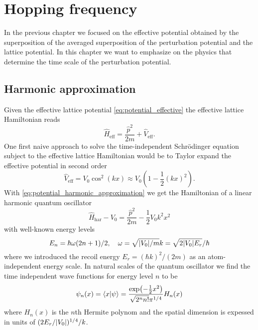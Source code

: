 \chapter{Hopping frequency}

In the previous chapter we focused on the effective potential obtained by the
superposition of the averaged superposition of the perturbation potential and
the lattice potential. In this chapter we want to emphasize on the physics
that determine the time scale of the perturbation potential.

\section{Harmonic approximation}

Given the effective lattice potential \cref{eq:potential_effective} the
effective lattice Hamiltonian reads
\begin{equation}
  \hat{H}_\text{eff}
  =\frac{\hat{p}^2}{2m}+\hat{V}_\text{eff}
  \label{eq:hamiltonian_effective}.
\end{equation}
One first naive approach to solve the time-independent Schrödinger equation
subject to the effective lattice Hamiltonian would be to Taylor expand
the effective potential in second order
\begin{equation}
  \hat{V}_\text{eff}
  =V_0\cos^2(kx)
  \approx V_0\left(1-\frac{1}{2}(kx)^2\right)
  \label{eq:potential_harmonic_approximation}.
\end{equation}
With \cref{eq:potential_harmonic_approximation} we get the Hamiltonian of a
linear harmonic quantum oscillator
\begin{equation}
  \hat{H}_\text{har}-V_0
  =\frac{\hat{p}^2}{2m}-\frac{1}{2}V_0k^2x^2
  \label{eq:hamiltonian_harmonic_approximation}
\end{equation}
with well-known energy levels
\begin{equation}
  E_n=\hbar\omega(2n+1)/2
  \qc
  \omega=\sqrt{\abs{V_0}/m}k=\sqrt{2\abs{V_0}E_r}/\hbar
  \label{eq:energy_harmonic_approximation}
\end{equation}
where we introduced the recoil energy $E_r=(\hbar k)^2/(2m)$ as an
atom-independent energy scale. In natural scales of the quantum oscillator
we find the time independent wave functions for energy level $n$ to be
\begin{equation}
  \psi_n(x)
  =
  \bra{x}\ket{\psi}
  =
  \frac{\exp(-\frac{1}{2}x^2)}{\sqrt{2^nn!}\pi^{1/4}}H_n(x)
  \label{eq:wavefunction_harmonic}
\end{equation}
where $H_n(x)$ is the $n$th Hermite polynom and the spatial dimension is
expessed in units of $(2E_r/\abs{V_0})^{1/4}/k$.

